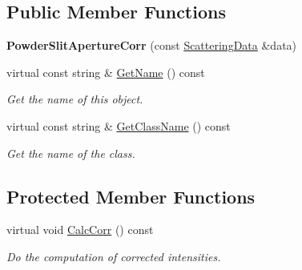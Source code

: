 \subsection*{Public Member Functions}
\begin{DoxyCompactItemize}
\item 
\mbox{\label{class_obj_cryst_1_1_powder_slit_aperture_corr_a8c7814fd23c9e2fe96a904ea41137caf}} 
{\bfseries Powder\+Slit\+Aperture\+Corr} (const \mbox{\hyperlink{class_obj_cryst_1_1_scattering_data}{Scattering\+Data}} \&data)
\item 
\mbox{\label{class_obj_cryst_1_1_powder_slit_aperture_corr_aeb52b00a9ba5851f40653dcd649d1a2e}} 
virtual const string \& \mbox{\hyperlink{class_obj_cryst_1_1_powder_slit_aperture_corr_aeb52b00a9ba5851f40653dcd649d1a2e}{Get\+Name}} () const
\begin{DoxyCompactList}\small\item\em Get the name of this object. \end{DoxyCompactList}\item 
\mbox{\label{class_obj_cryst_1_1_powder_slit_aperture_corr_ae813a493bc1b36bf351dbce7f5184197}} 
virtual const string \& \mbox{\hyperlink{class_obj_cryst_1_1_powder_slit_aperture_corr_ae813a493bc1b36bf351dbce7f5184197}{Get\+Class\+Name}} () const
\begin{DoxyCompactList}\small\item\em Get the name of the class. \end{DoxyCompactList}\end{DoxyCompactItemize}
\subsection*{Protected Member Functions}
\begin{DoxyCompactItemize}
\item 
\mbox{\label{class_obj_cryst_1_1_powder_slit_aperture_corr_a0656d25a3fcc02cfef3895fdbc41b35e}} 
virtual void \mbox{\hyperlink{class_obj_cryst_1_1_powder_slit_aperture_corr_a0656d25a3fcc02cfef3895fdbc41b35e}{Calc\+Corr}} () const
\begin{DoxyCompactList}\small\item\em Do the computation of corrected intensities. \end{DoxyCompactList}\end{DoxyCompactItemize}

